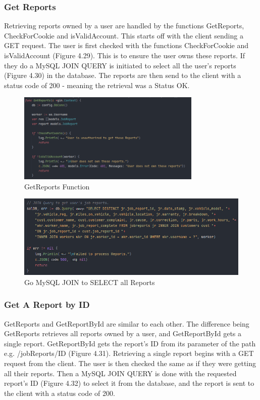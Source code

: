 \subsubsection{Get Reports}
Retrieving reports owned by a user are handled by the functions GetReports, CheckForCookie and isValidAccount. This starts off with the client sending a GET request. The user is first checked with the functions CheckForCookie and isValidAccount (Figure 4.29). This is to ensure the user owns these reports. If they do a MySQL JOIN QUERY is initiated to select all the user's reports (Figure 4.30) in the database. The reports are then send to the client with a status code of 200 - meaning the retrieval was a Status OK.

\begin{figure}[H]
    \caption{GetReports Function}
    \label{image:getReports}
    \centering
    \includegraphics[width=0.78\textwidth]{images/horton/report_system/get_reports.png}
\end{figure}

\begin{figure}[H]
    \caption{Go MySQL JOIN to SELECT all Reports}
    \label{image:go_mysql_join}
    \centering
    \includegraphics[width=1.0\textwidth]{images/horton/report_system/go_mysql_join.png}
\end{figure}

\subsubsection{Get A Report by ID}
GetReports and GetReportById are similar to each other. The difference being GetReports retrieves all reports owned by a user, and GetReportById gets a single report. GetReportById gets the report's ID from its parameter of the path e.g. /jobReports/ID (Figure 4.31). Retrieving a single report begins with a GET request from the client. The user is then checked the same as if they were getting all their reports. Then a MySQL JOIN QUERY is done with the requested report's ID (Figure 4.32) to select it from the database, and the report is sent to the client with a status code of 200.

